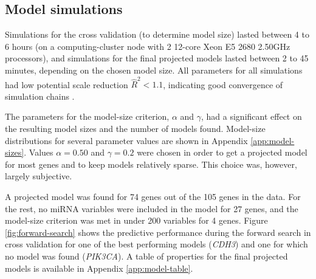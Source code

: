 \subsection*{Model simulations}

Simulations for the cross validation (to determine model size) lasted
between 4 to 6 hours (on a computing-cluster node with 2 12-core Xeon E5 2680
2.50GHz processors), and simulations for the final projected models lasted
between 2 to 45 minutes, depending on the chosen model size. All parameters for all
simulations had low potential scale reduction $\hat{R}^2 < 1.1$, indicating
good convergence of simulation chains \citep{Gelman2013}.

The parameters for the model-size criterion, $\alpha$ and $\gamma$, had a
significant effect on the resulting model sizes and the number of models
found. Model-size distributions for several parameter values are shown in
Appendix \ref{app:model-sizes}. Values $\alpha = 0.50$ and $\gamma = 0.2$ were
chosen in order to get a projected model for most genes and to keep models
relatively sparse. This choice was, however, largely subjective.

A projected model was found for 74 genes out of the
105 genes in the data. For the rest, no miRNA variables were included in the model
for 27 genes, and the model-size criterion was met in under 200 variables for 4 genes.
Figure \ref{fig:forward-search} shows the predictive performance during the
forward search in cross validation for one of the best performing models (\emph{CDH3})
and one for which no model was found (\emph{PIK3CA}). A table of properties for the
final projected models is available in Appendix \ref{app:model-table}.

